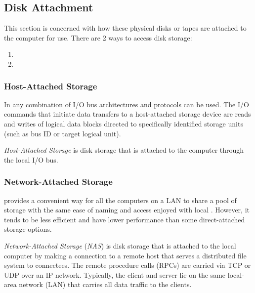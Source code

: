 \subsection{Disk Attachment}\label{subsec:Disk_Attachment}
This section is concerned with how these physical disks or tapes are attached to the computer for use.
There are 2 ways to access disk storage:
\begin{enumerate}[noitemsep]
\item {}
\item {}
\end{enumerate}

\subsubsection{Host-Attached Storage}\label{subsubsec:Host_Attached_Storage}
In  any combination of I/O bus architectures and protocols can be used.
The I/O commands that initiate data transfers to a host-attached storage device are reads and writes of logical data blocks directed to specifically identified storage units (such as bus ID or target logical unit).

\begin{definition}\label{def:Host_Attached_Storage}
  \emph{Host-Attached Storage} is disk storage that is attached to the computer through the local I/O bus.
\end{definition}

\subsubsection{Network-Attached Storage}\label{subsubsec:Network_Attached_Storage}
 provides a convenient way for all the computers on a LAN to share a pool of storage with the same ease of naming and access enjoyed with local .
However, it tends to be less efficient and have lower performance than some direct-attached storage options.

\begin{definition}\label{def:Network_Attached_Storage}
  \emph{Network-Attached Storage} (\emph{NAS}) is disk storage that is attached to the local computer by making a connection to a remote host that serves a distributed file system to connectees.
  The remote procedure calls (RPCs) are carried via TCP or UDP over an IP network.
  Typically, the client and server lie on the same local-area network (LAN) that carries all data traffic to the clients.
\end{definition}

